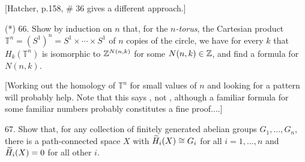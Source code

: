 \documentclass[12pt]{article}
\begin{document}
\begin{description}
\ssk

\item{\spc} [Hatcher, p.158, \# 36 gives a different approach.]

\msk

\item{(*)} 66. Show by induction on $n$ that, for the {\it $n$-torus}, 
the Cartesian product ${\mathbb T}^n = (S^1)^n = S^1\times\cdots\times S^1$ of $n$ copies of the circle,
we have for 
every $k$ that $H_k({\mathbb T}^n)$
is isomorphic to ${\mathbb Z}^{N(n,k)}$ for some $N(n,k)\in{\mathbb Z}$, and find a formula for 
$N(n,k)$. 

\msk

\item{\spc} [Working out the homology of ${\mathbb T}^n$ for small values of $n$ and looking for a pattern 
will probably help. Note that this says , not , although a familiar formula
for some familiar numbers probably constitutes a fine proof....]

\msk

\item{67.} Show that, for any collection of finitely generated abelian groups $G_1,\ldots ,G_n$,
there is a path-connected space $X$ with $\widetilde{H}_i(X)\cong G_i$ for all $i=1,\ldots,n$ and
$\widetilde{H}_i(X)=0$ for all other $i$.


\end{description}
\vfill
\end{document}
